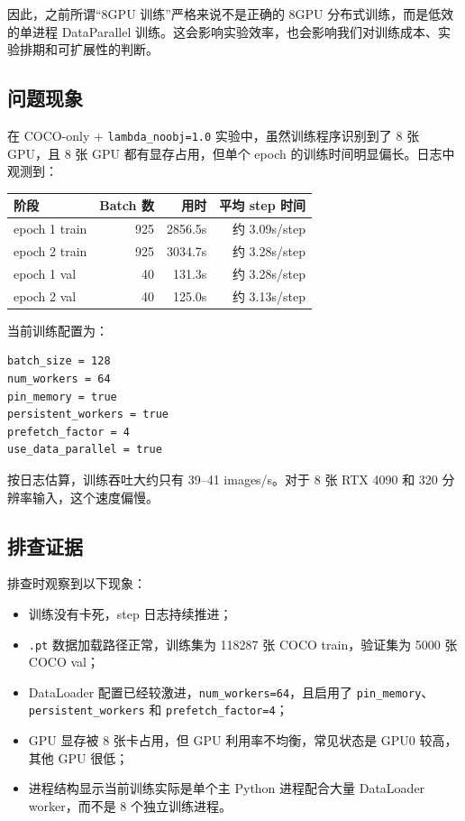 \documentclass[UTF8]{ctexart}
\begin{document}
因此，之前所谓“8GPU 训练”严格来说不是正确的 8GPU 分布式训练，而是低效的单进程 DataParallel 训练。这会影响实验效率，也会影响我们对训练成本、实验排期和可扩展性的判断。

\subsection{问题现象}

在 COCO-only + \texttt{lambda\_noobj=1.0} 实验中，虽然训练程序识别到了 8 张 GPU，且 8 张 GPU 都有显存占用，但单个 epoch 的训练时间明显偏长。日志中观测到：

\begin{center}
\begin{tabular}{lrrr}
\toprule
阶段 & Batch 数 & 用时 & 平均 step 时间 \\
\midrule
epoch 1 train & 925 & 2856.5s & 约 3.09s/step \\
epoch 2 train & 925 & 3034.7s & 约 3.28s/step \\
epoch 1 val & 40 & 131.3s & 约 3.28s/step \\
epoch 2 val & 40 & 125.0s & 约 3.13s/step \\
\bottomrule
\end{tabular}
\end{center}

当前训练配置为：

\begin{verbatim}
batch_size = 128
num_workers = 64
pin_memory = true
persistent_workers = true
prefetch_factor = 4
use_data_parallel = true
\end{verbatim}

按日志估算，训练吞吐大约只有 39--41 images/s。对于 8 张 RTX 4090 和 320 分辨率输入，这个速度偏慢。

\subsection{排查证据}

排查时观察到以下现象：

\begin{itemize}[leftmargin=2em]
  \item 训练没有卡死，step 日志持续推进；
  \item \texttt{.pt} 数据加载路径正常，训练集为 118287 张 COCO train，验证集为 5000 张 COCO val；
  \item DataLoader 配置已经较激进，\texttt{num\_workers=64}，且启用了 \texttt{pin\_memory}、\texttt{persistent\_workers} 和 \texttt{prefetch\_factor=4}；
  \item GPU 显存被 8 张卡占用，但 GPU 利用率不均衡，常见状态是 GPU0 较高，其他 GPU 很低；
  \item 进程结构显示当前训练实际是单个主 Python 进程配合大量 DataLoader worker，而不是 8 个独立训练进程。
\end{itemize}
\end{document}
